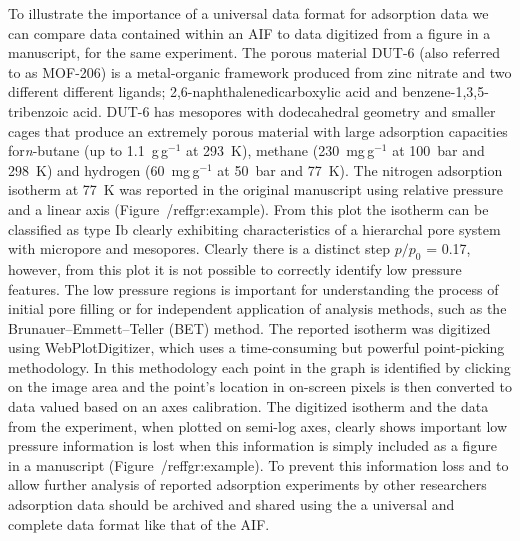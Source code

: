 \documentclass[journal=langd5,manuscript=article]{achemso}
\begin{document}
To illustrate the importance of a universal data format for adsorption data we can compare data contained within an AIF to data digitized from a figure in a manuscript, for the same experiment.
The porous material DUT-6 (also referred to as MOF-206) is a metal-organic framework produced from zinc nitrate and two different different ligands; 2,6-naphthalenedicarboxylic acid and benzene-1,3,5-tribenzoic acid.\cite{10.1002/anie.200904599}
DUT-6 has mesopores with dodecahedral geometry and smaller cages that produce an extremely porous material with large adsorption capacities for\textit{n}-butane (up to 1.1~g$\,$g$^{-1}$ at 293~K),  methane (230~mg$\,$g$^{-1}$ at 100~bar and 298~K) and hydrogen (60~mg$\,$g$^{-1}$ at 50~bar and 77~K).
The nitrogen adsorption isotherm at 77~K was reported in the original manuscript using relative pressure and a linear axis (Figure~/ref{fgr:example}).
From this plot the isotherm can be classified  as  type  Ib clearly exhibiting characteristics of a hierarchal pore system with micropore and mesopores.
Clearly there is a distinct step $p/p_0$ = 0.17, however, from this plot it is not possible to correctly identify low pressure features.
The low pressure regions is important for understanding the process of initial pore filling or for independent application of analysis methods, such as the Brunauer–Emmett–Teller (BET) method.
The reported isotherm was digitized using WebPlotDigitizer, which uses a time-consuming but powerful point-picking methodology.\cite{webplotdigitizer}
In this methodology each point in the graph is identified by clicking on the image area and the point's location in on-screen pixels is then converted to data valued based on an axes calibration.
The digitized isotherm and the data from the experiment, when plotted on semi-log axes, clearly shows important low pressure information is lost when this information is simply included as a figure in a manuscript (Figure~/ref{fgr:example}).
To prevent this information loss and to allow further analysis of reported adsorption experiments by other researchers adsorption data should be archived and shared using the a universal and complete data format like that of the AIF.
\end{document}
